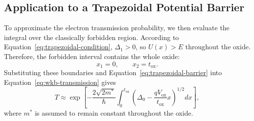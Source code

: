 \documentclass[12pt]{article}
\begin{document}
\subsection{Application to a Trapezoidal Potential Barrier}
To approximate the electron transmission probability, we then evaluate the integral over the classically forbidden region. According to Equation~\eqref{eq:trapezoidal-condition}, \(\Delta_1>0\), so \(U(x)>E\) throughout the oxide. Therefore, the forbidden interval contains the whole oxide:
\begin{equation}
    x_1=0,
    \qquad
    x_2=t_{\mathrm{ox}}.
    \label{eq:oxide-forbidden-interval}
\end{equation}
Substituting these boundaries and Equation~\eqref{eq:trapezoidal-barrier} into Equation~\eqref{eq:wkb-transmission} gives
\begin{equation}
    T\approx
    \exp\left[
        -\frac{2\sqrt{2m^*}}{\hbar}
        \int_0^{t_{\mathrm{ox}}}
        \left(
            \Delta_0-
            \frac{qV_{\mathrm{ox}}}{t_{\mathrm{ox}}}x
        \right)^{1/2}dx
    \right],
    \label{eq:trapezoidal-wkb-integral}
\end{equation}
where \(m^*\) is assumed to remain constant throughout the oxide.
\end{document}
